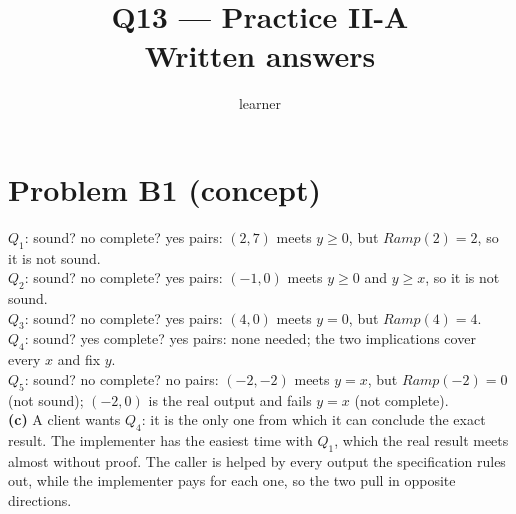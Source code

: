 \documentclass[11pt]{article}
\title{Q13 --- Practice II-A \\ \large Written answers}
\author{learner}
\date{}
\begin{document}
\maketitle
\sloppy

\section*{Problem B1 (concept)}\label{ans:B1}
\begin{answer}
$Q_1$: sound? no \quad complete? yes \quad pairs: $(2, 7)$ meets $y \ge 0$,
but $\mathit{Ramp}(2) = 2$, so it is not sound. \\
$Q_2$: sound? no \quad complete? yes \quad pairs: $(-1, 0)$ meets $y \ge 0$ and
$y \ge x$, so it is not sound. \\
$Q_3$: sound? no \quad complete? yes \quad pairs: $(4, 0)$ meets $y = 0$, but
$\mathit{Ramp}(4) = 4$. \\
$Q_4$: sound? yes \quad complete? yes \quad pairs: none needed; the two
implications cover every $x$ and fix $y$. \\
$Q_5$: sound? no \quad complete? no \quad pairs: $(-2, -2)$ meets $y = x$, but
$\mathit{Ramp}(-2) = 0$ (not sound); $(-2, 0)$ is the real output and fails
$y = x$ (not complete). \\
\textbf{(c)} A client wants $Q_4$: it is the only one from which it can
conclude the exact result. The implementer has the easiest time with $Q_1$,
which the real result meets almost without proof. The caller is helped by
every output the specification rules out, while the implementer pays for each
one, so the two pull in opposite directions.
\end{answer}

\end{document}
